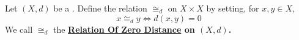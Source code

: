 \label{def:relationofzerodistance}
\newcommand{\RelationOfZeroDistance}[0]{
    \bf \hyperref[def:relationofzerodistance]{Relation Of Zero Distance} \rm
}
\begin{df}
    Let $(X,d)$ be a \PseudometricSpace. 
    Define the relation  $\cong_d$ on $X \times X$ by setting, for $x,y \in X$, 
    \begin{equation}
        x \cong_d y \iff d(x,y) = 0
    \end{equation}
    We call $\cong_d$ the \RelationOfZeroDistance on $(X,d)$. 
\end{df}